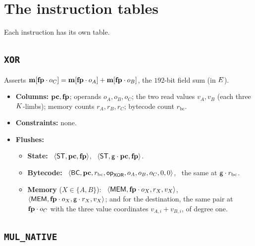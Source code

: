 \section{The instruction tables}\label{sec:tables}

Each instruction has its own table.

\subsection{\texttt{XOR}}\label{sec:tab-xor}

Asserts $\mathbf{m}[\mathbf{fp}\cdot o_C]=\mathbf{m}[\mathbf{fp}\cdot o_A]+\mathbf{m}[\mathbf{fp}\cdot o_B]$, the $192$-bit field sum (in $E$).
\begin{itemize}
\item \textbf{Columns:} $\mathbf{pc},\mathbf{fp}$; operands $o_A,o_B,o_C$; the two read values $v_A,v_B$ (each three $K$-limbs); memory counts $r_A,r_B,r_C$; bytecode count $r_{\mathrm{bc}}$.
\item \textbf{Constraints:} none.
\item \textbf{Flushes:}
  \begin{itemize}
  \item \textbf{State:} \pull\ $\langle \mathsf{ST},\mathbf{pc},\mathbf{fp} \rangle$, \push\ $\langle \mathsf{ST},\mathsf{g}\cdot\mathbf{pc},\mathbf{fp} \rangle$.
  \item \textbf{Bytecode:} \pull\ $\langle \mathsf{BC},\mathbf{pc},r_{\mathrm{bc}},\mathsf{op}_{\mathsf{XOR}},o_A,o_B,o_C,0,0 \rangle$, \push\ the same at $\mathsf{g}\cdot r_{\mathrm{bc}}$.
  \item \textbf{Memory} ($X\in\{A,B\}$): \pull\ $\langle \mathsf{MEM},\mathbf{fp}\cdot o_X,r_X,v_X \rangle$, \push\ $\langle \mathsf{MEM},\mathbf{fp}\cdot o_X,\mathsf{g}\cdot r_X,v_X \rangle$; and for the destination, the same pair at $\mathbf{fp}\cdot o_C$ with the three value coordinates $v_{A,i}+v_{B,i}$, of degree one.
  \end{itemize}
\end{itemize}

\subsection{\texttt{MUL\_NATIVE}}\label{sec:tab-mul}

